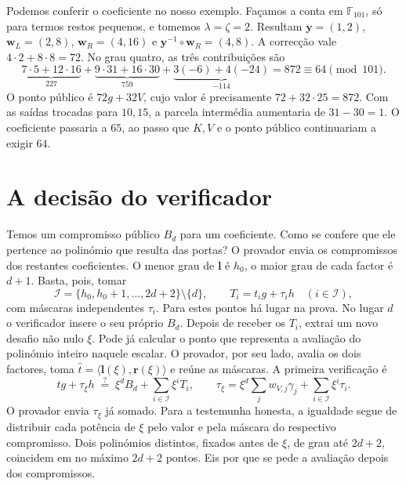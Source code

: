 Podemos conferir o coeficiente no nosso exemplo. Façamos a conta
em \(\mathbb F_{101}\), só para termos restos pequenos, e tomemos
\(\lambda=\zeta=2\). Resultam
\(\boldsymbol y=(1,2)\), \(\boldsymbol w_L=(2,8)\),
\(\boldsymbol w_R=(4,16)\) e
\(\boldsymbol y^{-1}\circ\boldsymbol w_R=(4,8)\).
A correcção vale \(4\cdot2+8\cdot8=72\). No grau quatro,
as três contribuições são
\[
 \underbrace{7\cdot5+12\cdot16}_{227}
 +\underbrace{9\cdot31+16\cdot30}_{759}
 +\underbrace{3(-6)+4(-24)}_{-114}=872\equiv64\pmod{101}.
\]
O ponto público é \(72g+32V\), cujo valor é precisamente
\(72+32\cdot25=872\). Com as saídas trocadas para \(10,15\),
a parcela intermédia aumentaria de \(31-30=1\). O coeficiente
passaria a \(65\), ao passo que \(K,V\) e o ponto público
continuariam a exigir \(64\).

\section{A decisão do verificador}
\label{sec:gbp-verificacao}

Temos um compromisso público \(B_d\) para um coeficiente. Como se
confere que ele pertence ao polinómio que resulta das portas? O provador
envia os compromissos dos restantes coeficientes. O menor grau de
\(\boldsymbol l\) é \(h_0\), o maior grau de cada factor é \(d+1\).
Basta, pois, tomar
\[
 \mathcal I=\{h_0,h_0+1,\ldots,2d+2\}\setminus\{d\},\qquad
 T_i=t_i g+\tau_i h \quad(i\in\mathcal I),
\]
com máscaras independentes \(\tau_i\). Para estes pontos há lugar na
prova. No lugar \(d\) o verificador insere o seu próprio \(B_d\).
Depois de receber os \(T_i\), extrai um novo desafio não nulo \(\xi\).
Pode já calcular o ponto que representa a avaliação do polinómio inteiro
naquele escalar. O provador, por seu lado, avalia os dois factores,
toma \(\widehat t=\langle\boldsymbol l(\xi),\boldsymbol r(\xi)\rangle\)
e reúne as máscaras. A primeira verificação é
\begin{equation}
 \widehat t g+\tau_\xi h
     \;\stackrel{?}{=}\; \xi^d B_d+\sum_{i\in\mathcal I}\xi^i T_i,
 \qquad
 \tau_\xi=\xi^d\sum_jw_{V,j}\gamma_j+\sum_{i\in\mathcal I}\xi^i\tau_i.
 \label{eq:gbp-ver-pol}
\end{equation}
O provador envia \(\tau_\xi\) já somado. Para a testemunha honesta, a
igualdade segue de distribuir cada potência de \(\xi\) pelo valor e pela
máscara do respectivo compromisso. Dois polinómios distintos, fixados
antes de \(\xi\), de grau até \(2d+2\), coincidem em no máximo \(2d+2\)
pontos. Eis por que se pede a avaliação depois dos compromissos.

